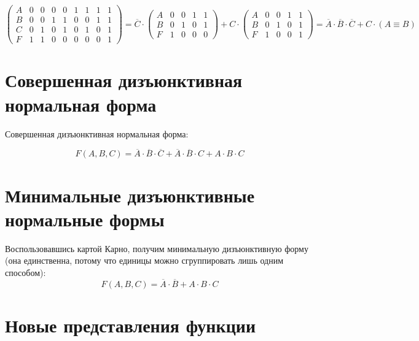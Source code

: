 \documentclass[a4paper,10pt]{article} %
\begin{document}
	\begin{equation}
		\left(
		\begin{smallmatrix}
			A & 0 & 0 & 0 & 0 & 1 & 1 & 1 & 1 \\
			B & 0 & 0 & 1 & 1 & 0 & 0 & 1 & 1 \\
			C & 0 & 1 & 0 & 1 & 0 & 1 & 0 & 1 \\
			F & 1 & 1 & 0 & 0 & 0 & 0 & 0 & 1
		\end{smallmatrix}
		\right)
		= \overline{C} \cdot 
		\left(
		\begin{smallmatrix}
			A & 0 & 0 & 1 & 1 \\
			B & 0 & 1 & 0 & 1 \\
			F & 1 & 0 & 0 & 0
		\end{smallmatrix}
		\right)
		+ C \cdot
		\left(
		\begin{smallmatrix}
			A & 0 & 0 & 1 & 1 \\
			B & 0 & 1 & 0 & 1 \\
			F & 1 & 0 & 0 & 1
		\end{smallmatrix}
		\right)
		= \overline{A} \cdot \overline{B} \cdot \overline{C} + C \cdot (A \equiv B) 
	\end{equation}
	
	\section{Совершенная дизъюнктивная нормальная форма}
	
	Совершенная дизъюнктивная нормальная форма: 
	
	\begin{equation}
		F(A, B, C) = \overline{A} \cdot \overline{B} \cdot \overline{C} +
		\overline{A} \cdot \overline{B} \cdot C + 
		A \cdot B \cdot C 
	\end{equation}
	
	\section{Минимальные дизъюнктивные нормальные формы}
	
	Воспользовавшись картой Карно, получим минимальную дизъюнктивную форму (она единственна, потому что единицы можно сгруппировать лишь одним способом):
	\begin{equation}
		F(A, B, C) = \overline{A} \cdot \overline{B} + A \cdot B \cdot C 
	\end{equation}

	\section{Новые представления функции}
	
\end{document}
